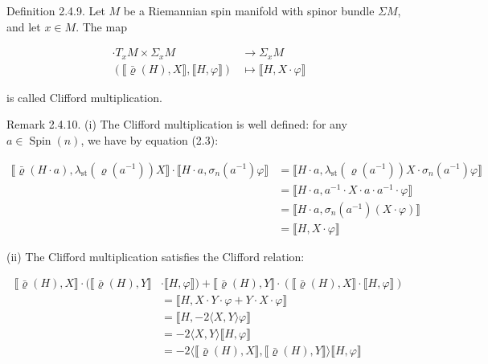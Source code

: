 \documentclass[10pt, letterpaper]{article}
\begin{document}
Definition 2.4.9. Let $M$ be a Riemannian spin manifold with spinor bundle $\Sigma M$, and let $x \in M$. The map

$$
\begin{aligned}
\cdot T_{x} M \times \Sigma_{x} M & \longrightarrow \Sigma_{x} M \\
(\llbracket \bar{\varrho}(H), X \rrbracket, \llbracket H, \varphi \rrbracket) & \longmapsto \llbracket H, X \cdot \varphi \rrbracket
\end{aligned}
$$

is called Clifford multiplication.

Remark 2.4.10. (i) The Clifford multiplication is well defined: for any $a \in \operatorname{Spin}(n)$, we have by equation (2.3):

$$
\begin{aligned}
\llbracket \bar{\varrho}(H \cdot a), \lambda_{\mathrm{st}}\left(\varrho\left(a^{-1}\right)\right) X \rrbracket \cdot \llbracket H \cdot a, \sigma_{n}\left(a^{-1}\right) \varphi \rrbracket & =\llbracket H \cdot a, \lambda_{\mathrm{st}}\left(\varrho\left(a^{-1}\right)\right) X \cdot \sigma_{n}\left(a^{-1}\right) \varphi \rrbracket \\
& =\llbracket H \cdot a, a^{-1} \cdot X \cdot a \cdot a^{-1} \cdot \varphi \rrbracket \\
& =\llbracket H \cdot a, \sigma_{n}\left(a^{-1}\right)(X \cdot \varphi) \rrbracket \\
& =\llbracket H, X \cdot \varphi \rrbracket
\end{aligned}
$$

(ii) The Clifford multiplication satisfies the Clifford relation:

$$
\begin{aligned}
\llbracket \bar{\varrho}(H), X \rrbracket \cdot(\llbracket \bar{\varrho}(H), Y \rrbracket & \cdot \llbracket H, \varphi \rrbracket)+\llbracket \bar{\varrho}(H), Y \rrbracket \cdot(\llbracket \bar{\varrho}(H), X \rrbracket \cdot \llbracket H, \varphi \rrbracket) \\
& =\llbracket H, X \cdot Y \cdot \varphi+Y \cdot X \cdot \varphi \rrbracket \\
& =\llbracket H,-2\langle X, Y\rangle \varphi \rrbracket \\
& =-2\langle X, Y\rangle \llbracket H, \varphi \rrbracket \\
& =-2\langle\llbracket \bar{\varrho}(H), X \rrbracket, \llbracket \bar{\varrho}(H), Y \rrbracket\rangle \llbracket H, \varphi \rrbracket
\end{aligned}
$$
\end{document}
